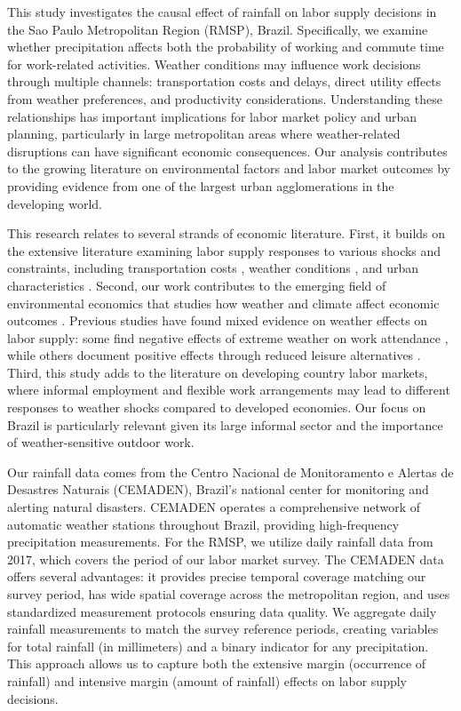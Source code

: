 This study investigates the causal effect of rainfall on labor supply decisions in the Sao Paulo Metropolitan Region (RMSP), Brazil. Specifically, we examine whether precipitation affects both the probability of working and commute time for work-related activities. Weather conditions may influence work decisions through multiple channels: transportation costs and delays, direct utility effects from weather preferences, and productivity considerations. Understanding these relationships has important implications for labor market policy and urban planning, particularly in large metropolitan areas where weather-related disruptions can have significant economic consequences. Our analysis contributes to the growing literature on environmental factors and labor market outcomes by providing evidence from one of the largest urban agglomerations in the developing world.

This research relates to several strands of economic literature. First, it builds on the extensive literature examining labor supply responses to various shocks and constraints, including transportation costs \citep{zenou2009urban}, weather conditions \citep{connolly2008here}, and urban characteristics \citep{moretti2011local}. Second, our work contributes to the emerging field of environmental economics that studies how weather and climate affect economic outcomes \citep{hsiang2016climate}. Previous studies have found mixed evidence on weather effects on labor supply: some find negative effects of extreme weather on work attendance \citep{lee2016temperature}, while others document positive effects through reduced leisure alternatives \citep{connolly2008here}. Third, this study adds to the literature on developing country labor markets, where informal employment and flexible work arrangements may lead to different responses to weather shocks compared to developed economies. Our focus on Brazil is particularly relevant given its large informal sector and the importance of weather-sensitive outdoor work.

Our rainfall data comes from the Centro Nacional de Monitoramento e Alertas de Desastres Naturais (CEMADEN), Brazil's national center for monitoring and alerting natural disasters. CEMADEN operates a comprehensive network of automatic weather stations throughout Brazil, providing high-frequency precipitation measurements. For the RMSP, we utilize daily rainfall data from 2017, which covers the period of our labor market survey. The CEMADEN data offers several advantages: it provides precise temporal coverage matching our survey period, has wide spatial coverage across the metropolitan region, and uses standardized measurement protocols ensuring data quality. We aggregate daily rainfall measurements to match the survey reference periods, creating variables for total rainfall (in millimeters) and a binary indicator for any precipitation. This approach allows us to capture both the extensive margin (occurrence of rainfall) and intensive margin (amount of rainfall) effects on labor supply decisions.

